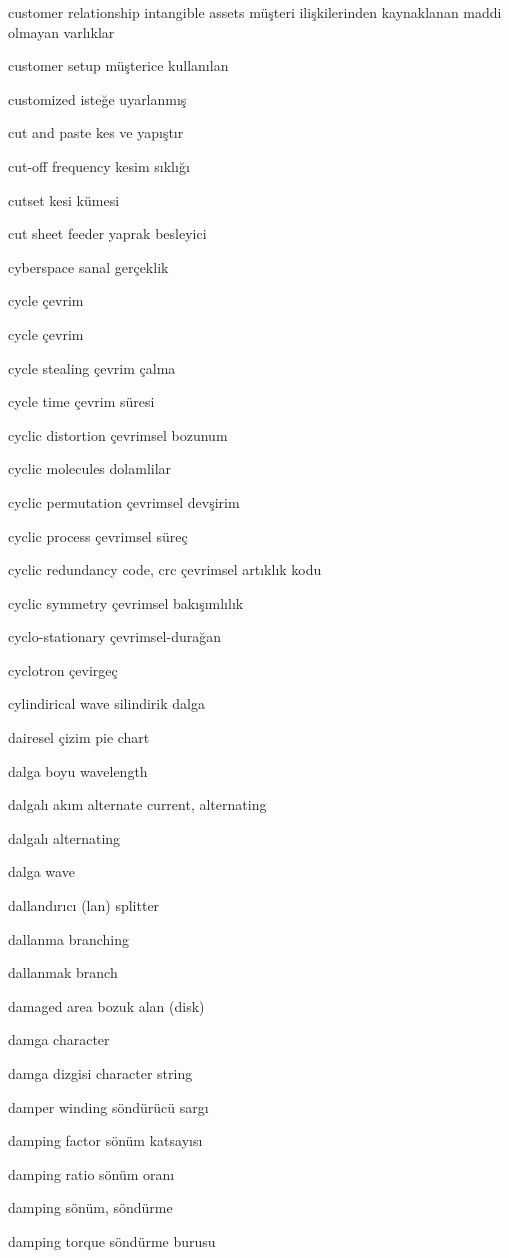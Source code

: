 \documentclass[12pt,fleqn]{article}\usepackage{../../common}
\begin{document}
customer relationship intangible assets müşteri ilişkilerinden kaynaklanan maddi olmayan varlıklar

customer setup müşterice kullanılan

customized isteğe uyarlanmış

cut and paste kes ve yapıştır

cut-off frequency kesim sıklığı

cutset kesi kümesi

cut sheet feeder yaprak besleyici

cyberspace sanal gerçeklik

cycle çevrim

cycle çevrim

cycle stealing çevrim çalma

cycle time çevrim süresi

cyclic distortion çevrimsel bozunum

cyclic molecules dolamlilar

cyclic permutation çevrimsel devşirim

cyclic process çevrimsel süreç

cyclic redundancy code, crc çevrimsel artıklık kodu

cyclic symmetry çevrimsel bakışımlılık

cyclo-stationary çevrimsel-durağan

cyclotron çevirgeç

cylindirical wave silindirik dalga

dairesel çizim pie chart

dalga boyu wavelength

dalgalı akım alternate current, alternating

dalgalı alternating

dalga wave

dallandırıcı (lan) splitter

dallanma branching

dallanmak branch

damaged area bozuk alan (disk)

damga character

damga dizgisi character string

damper winding söndürücü sargı

damping factor sönüm katsayısı

damping ratio sönüm oranı

damping sönüm, söndürme

damping torque söndürme burusu
\end{document}
